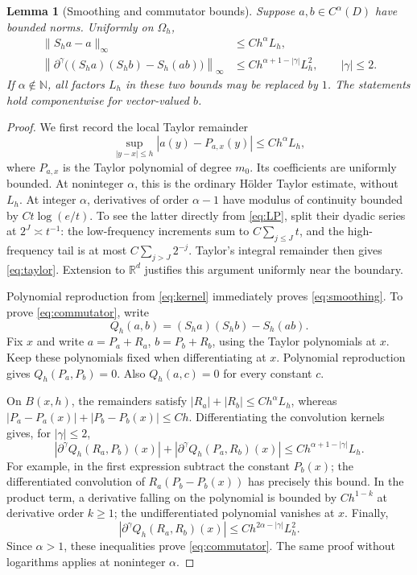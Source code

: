 \documentclass[11pt]{article}
\newtheorem{lemma}[theorem]{Lemma}
\theoremstyle{remark}
\newcommand{\R}{\mathbb R}
\begin{document}
\begin{lemma}[Smoothing and commutator bounds]\label{lem:commutator}
Suppose \(a,b\in C^\alpha(D)\) have bounded norms. Uniformly on
\(\Omega_h\),
\begin{align}
\|S_h a-a\|_\infty&\leq C h^\alpha L_h,
\label{eq:smoothing}\\
\left\|\partial^\gamma
\big((S_h a)(S_h b)-S_h(ab)\big)\right\|_\infty
&\leq C h^{\alpha+1-|\gamma|}L_h^2,
\qquad |\gamma|\leq2.
\label{eq:commutator}
\end{align}
If \(\alpha\notin\mathbb N\), all factors \(L_h\) in these two
bounds may be replaced by \(1\). The statements hold componentwise
for vector-valued \(b\).
\end{lemma}

\begin{proof}
We first record the local Taylor remainder
\begin{equation}\label{eq:taylor}
\sup_{|y-x|\leq h}|a(y)-P_{a,x}(y)|
\leq C h^\alpha L_h,
\end{equation}
where \(P_{a,x}\) is the Taylor polynomial of degree \(m_0\).
Its coefficients are uniformly bounded. At noninteger \(\alpha\),
this is the ordinary H\"older Taylor estimate, without \(L_h\).
At integer \(\alpha\), derivatives of order \(\alpha-1\) have
modulus of continuity bounded by \(Ct\log(e/t)\). To see the latter
directly from \eqref{eq:LP}, split their dyadic series at
\(2^J\asymp t^{-1}\): the low-frequency increments sum to
\(C\sum_{j\leq J}t\), and the high-frequency tail is at most
\(C\sum_{j>J}2^{-j}\). Taylor's integral remainder then gives
\eqref{eq:taylor}. Extension to \(\R^d\) justifies this argument
uniformly near the boundary.

Polynomial reproduction from \eqref{eq:kernel} immediately proves
\eqref{eq:smoothing}. To prove \eqref{eq:commutator}, write
\[
Q_h(a,b)=(S_h a)(S_h b)-S_h(ab).
\]
Fix \(x\) and write \(a=P_a+R_a\), \(b=P_b+R_b\), using the Taylor
polynomials at \(x\). Keep these polynomials fixed when differentiating
at \(x\). Polynomial reproduction gives \(Q_h(P_a,P_b)=0\).
Also \(Q_h(a,c)=0\) for every constant \(c\).

On \(B(x,h)\), the remainders satisfy
\(|R_a|+|R_b|\leq Ch^\alpha L_h\), whereas
\(|P_a-P_a(x)|+|P_b-P_b(x)|\leq Ch\).
Differentiating the convolution kernels gives, for \(|\gamma|\leq2\),
\[
|\partial^\gamma Q_h(R_a,P_b)(x)|
+
|\partial^\gamma Q_h(P_a,R_b)(x)|
\leq C h^{\alpha+1-|\gamma|}L_h.
\]
For example, in the first expression subtract the constant \(P_b(x)\);
the differentiated convolution of
\(R_a(P_b-P_b(x))\) has precisely this bound. In the product term,
a derivative falling on the polynomial is bounded by
\(Ch^{1-k}\) at derivative order \(k\geq1\); the undifferentiated
polynomial vanishes at \(x\). Finally,
\[
|\partial^\gamma Q_h(R_a,R_b)(x)|
\leq C h^{2\alpha-|\gamma|}L_h^2.
\]
Since \(\alpha>1\), these inequalities prove
\eqref{eq:commutator}. The same proof without logarithms applies
at noninteger \(\alpha\).
\end{proof}
\end{document}
